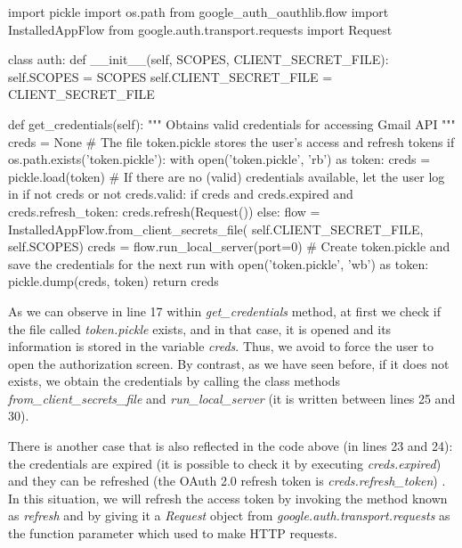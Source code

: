 \begin{pythonnum}
import pickle
import os.path
from google_auth_oauthlib.flow import InstalledAppFlow
from google.auth.transport.requests import Request
	
class auth:
	def __init__(self, SCOPES, CLIENT_SECRET_FILE):
		self.SCOPES = SCOPES
		self.CLIENT_SECRET_FILE = CLIENT_SECRET_FILE
	
	def get_credentials(self):
		"""
		Obtains valid credentials for accessing Gmail API
		"""
		creds = None
		# The file token.pickle stores the user's access and refresh tokens
		if os.path.exists('token.pickle'):
			with open('token.pickle', 'rb') as token:
				creds = pickle.load(token)
		# If there are no (valid) credentials available, let the user log in
		if not creds or not creds.valid:
			if creds and creds.expired and creds.refresh_token:
				creds.refresh(Request())
			else:
				flow = InstalledAppFlow.from_client_secrets_file(
					self.CLIENT_SECRET_FILE, self.SCOPES)
				creds = flow.run_local_server(port=0)
			# Create token.pickle and save the credentials for the next run
			with open('token.pickle', 'wb') as token:
				pickle.dump(creds, token)
		return creds

\end{pythonnum}

As we can observe in line 17 within \textit{get\_credentials} method, at first we check if the file called \textit{token.pickle} exists, and in that case, it is opened and its information is stored in the variable \textit{creds}. Thus, we avoid to force the user to open the authorization screen. By contrast, as we have seen before, if it does not exists, we obtain the credentials by calling the class methods \textit{from\_client\_secrets\_file} and \textit{run\_local\_server} (it is written between lines 25 and 30).

There is another case that is also reflected in the code above (in lines 23 and 24): the credentials are expired (it is possible to check it by executing \textit{creds.expired}) and they can be refreshed (the OAuth 2.0 refresh token is \textit{creds.refresh\_token}) \citep{oauth2.credentials}. In this situation, we will refresh the access token by invoking the method known as \textit{refresh} and by giving it a \textit{Request} object \citep{request-lib} from \textit{google.auth.transport.requests} as the function parameter which used to make HTTP requests.

